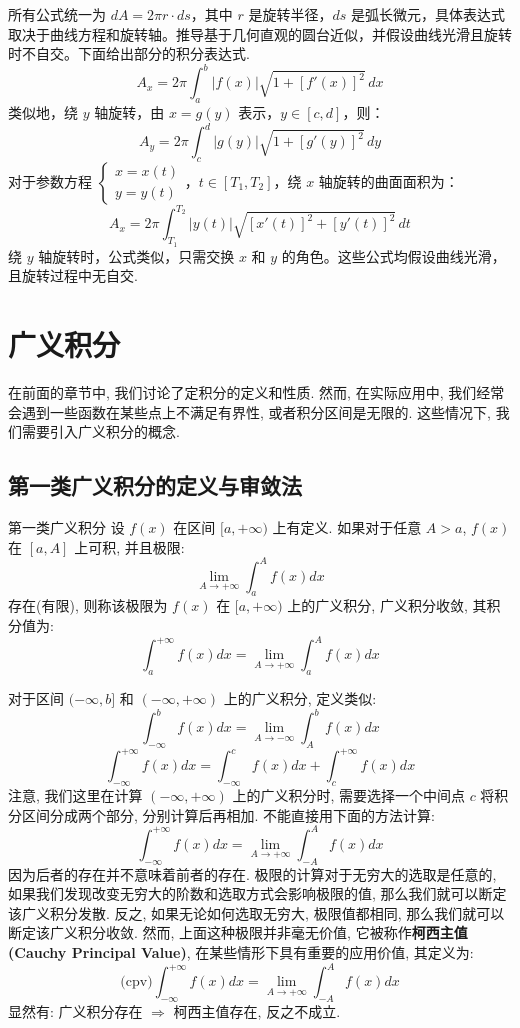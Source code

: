 \documentclass[a4paper,12pt]{ctexart}
\begin{document}
所有公式统一为 $dA = 2\pi r \cdot ds$，其中 $r$ 是旋转半径，$ds$ 是弧长微元，具体表达式取决于曲线方程和旋转轴。推导基于几何直观的圆台近似，并假设曲线光滑且旋转时不自交。下面给出部分的积分表达式.
$$
A_x = 2\pi \int_a^b |f(x)| \sqrt{1 + [f'(x)]^2} \, dx
$$
类似地，绕 $y$ 轴旋转，由 $x = g(y)$ 表示，$y \in [c, d]$，则：
$$
A_y = 2\pi \int_c^d |g(y)| \sqrt{1 + [g'(y)]^2} \, dy
$$
对于参数方程 $\begin{cases} x = x(t) \\ y = y(t) \end{cases}$，$t \in [T_1, T_2]$，绕 $x$ 轴旋转的曲面面积为：
$$
A_x = 2\pi \int_{T_1}^{T_2} |y(t)| \sqrt{[x'(t)]^2 + [y'(t)]^2} \, dt
$$
绕 $y$ 轴旋转时，公式类似，只需交换 $x$ 和 $y$ 的角色。这些公式均假设曲线光滑，且旋转过程中无自交.

\section{广义积分}

在前面的章节中, 我们讨论了定积分的定义和性质. 然而, 在实际应用中, 我们经常会遇到一些函数在某些点上不满足有界性, 或者积分区间是无限的. 这些情况下, 我们需要引入广义积分的概念.

\subsection{第一类广义积分的定义与审敛法}

\begin{mydef}{第一类广义积分}{}
设 $f(x)$ 在区间 $[a, +\infty)$ 上有定义. 如果对于任意 $A > a$, $f(x)$ 在 $[a, A]$ 上可积, 并且极限:
$$
\lim_{A \to +\infty} \int_a^A f(x) dx
$$
存在(有限), 则称该极限为 $f(x)$ 在 $[a, +\infty)$ 上的广义积分, 广义积分收敛, 其积分值为:
$$
\int_a^{+\infty} f(x) dx = \lim_{A \to +\infty} \int_a^A f(x) dx
$$
\end{mydef}

对于区间 $(-\infty, b]$ 和 $(-\infty, +\infty)$ 上的广义积分, 定义类似:
$$
\int_{-\infty}^b f(x) dx = \lim_{A \to -\infty} \int_A^b f(x) dx
$$
$$
\int_{-\infty}^{+\infty} f(x) dx = \int_{-\infty}^c f(x) dx + \int_c^{+\infty} f(x) dx
$$
注意, 我们这里在计算 $(-\infty, +\infty)$ 上的广义积分时, 需要选择一个中间点 $c$ 将积分区间分成两个部分, 分别计算后再相加. 不能直接用下面的方法计算:
$$
\int_{-\infty}^{+\infty} f(x) dx = \lim_{A \to +\infty} \int_{-A}^{A} f(x) dx
$$
因为后者的存在并不意味着前者的存在. 极限的计算对于无穷大的选取是任意的, 如果我们发现改变无穷大的阶数和选取方式会影响极限的值, 那么我们就可以断定该广义积分发散. 反之, 如果无论如何选取无穷大, 极限值都相同, 那么我们就可以断定该广义积分收敛. 然而, 上面这种极限并非毫无价值, 它被称作\textbf{柯西主值 (Cauchy Principal Value)}, 在某些情形下具有重要的应用价值, 其定义为:
$$
\text{(cpv)} \int_{-\infty}^{+\infty} f(x) dx = \lim_{A \to +\infty} \int_{-A}^{A} f(x) dx
$$
显然有: 广义积分存在 $\Rightarrow$ 柯西主值存在, 反之不成立.
\end{document}
